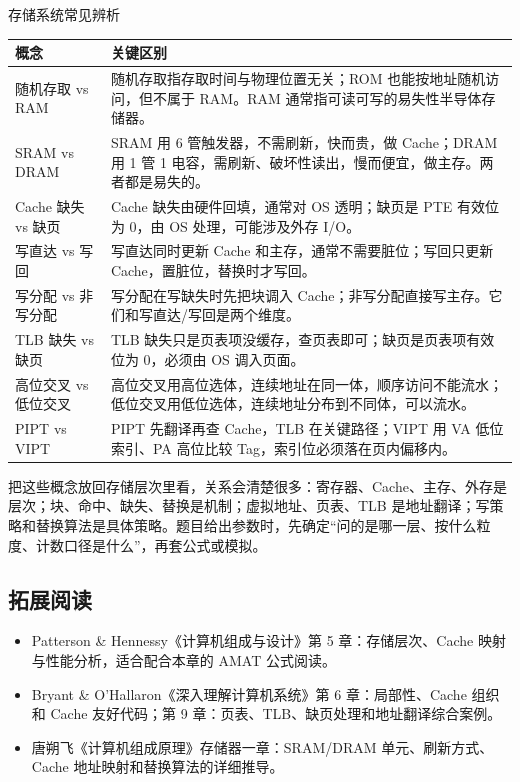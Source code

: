\begin{tablebox}{存储系统常见辨析}
\centering
\begin{tabularx}{\linewidth}{|p{3.0cm}|>{\raggedright\arraybackslash}X|}
\hline
概念 & 关键区别 \\
\hline
随机存取 vs RAM & 随机存取指存取时间与物理位置无关；ROM 也能按地址随机访问，但不属于 RAM。RAM 通常指可读可写的易失性半导体存储器。 \\
SRAM vs DRAM & SRAM 用 6 管触发器，不需刷新，快而贵，做 Cache；DRAM 用 1 管 1 电容，需刷新、破坏性读出，慢而便宜，做主存。两者都是易失的。 \\
Cache 缺失 vs 缺页 & Cache 缺失由硬件回填，通常对 OS 透明；缺页是 PTE 有效位为 0，由 OS 处理，可能涉及外存 I/O。 \\
写直达 vs 写回 & 写直达同时更新 Cache 和主存，通常不需要脏位；写回只更新 Cache，置脏位，替换时才写回。 \\
写分配 vs 非写分配 & 写分配在写缺失时先把块调入 Cache；非写分配直接写主存。它们和写直达/写回是两个维度。 \\
TLB 缺失 vs 缺页 & TLB 缺失只是页表项没缓存，查页表即可；缺页是页表项有效位为 0，必须由 OS 调入页面。 \\
高位交叉 vs 低位交叉 & 高位交叉用高位选体，连续地址在同一体，顺序访问不能流水；低位交叉用低位选体，连续地址分布到不同体，可以流水。 \\
PIPT vs VIPT & PIPT 先翻译再查 Cache，TLB 在关键路径；VIPT 用 VA 低位索引、PA 高位比较 Tag，索引位必须落在页内偏移内。 \\
\hline
\end{tabularx}
\end{tablebox}

把这些概念放回存储层次里看，关系会清楚很多：寄存器、Cache、主存、外存是层次；块、命中、缺失、替换是机制；虚拟地址、页表、TLB 是地址翻译；写策略和替换算法是具体策略。题目给出参数时，先确定“问的是哪一层、按什么粒度、计数口径是什么”，再套公式或模拟。

\subsection{拓展阅读}

\begin{itemize}
    \item Patterson \& Hennessy《计算机组成与设计》第 5 章：存储层次、Cache 映射与性能分析，适合配合本章的 AMAT 公式阅读。
    \item Bryant \& O'Hallaron《深入理解计算机系统》第 6 章：局部性、Cache 组织和 Cache 友好代码；第 9 章：页表、TLB、缺页处理和地址翻译综合案例。
    \item 唐朔飞《计算机组成原理》存储器一章：SRAM/DRAM 单元、刷新方式、Cache 地址映射和替换算法的详细推导。
\end{itemize}

\newpage

